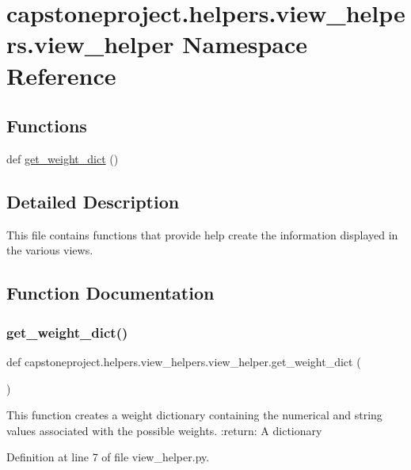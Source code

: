 \hypertarget{namespacecapstoneproject_1_1helpers_1_1view__helpers_1_1view__helper}{}\section{capstoneproject.\+helpers.\+view\+\_\+helpers.\+view\+\_\+helper Namespace Reference}
\label{namespacecapstoneproject_1_1helpers_1_1view__helpers_1_1view__helper}
\subsection*{Functions}
\begin{DoxyCompactItemize}
\item 
def \mbox{\hyperlink{namespacecapstoneproject_1_1helpers_1_1view__helpers_1_1view__helper_a20ef602fc8fc7f79eaf56c51081e56df}{get\+\_\+weight\+\_\+dict}} ()
\end{DoxyCompactItemize}


\subsection{Detailed Description}
\begin{DoxyVerb}This file contains functions that provide help create the information displayed in the various views.
\end{DoxyVerb}
 

\subsection{Function Documentation}
\mbox{\label{namespacecapstoneproject_1_1helpers_1_1view__helpers_1_1view__helper_a20ef602fc8fc7f79eaf56c51081e56df}} 
\subsubsection{\texorpdfstring{get\+\_\+weight\+\_\+dict()}{get\_weight\_dict()}}
{\footnotesize\ttfamily def capstoneproject.\+helpers.\+view\+\_\+helpers.\+view\+\_\+helper.\+get\+\_\+weight\+\_\+dict (\begin{DoxyParamCaption}{ }\end{DoxyParamCaption})}

\begin{DoxyVerb}This function creates a weight dictionary containing
the numerical and string values associated with the
possible weights.
:return: A dictionary
\end{DoxyVerb}
 

Definition at line 7 of file view\+\_\+helper.\+py.

